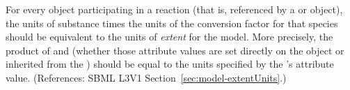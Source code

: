 For every \Species object participating in a reaction (that is, referenced
by a \SpeciesReference or \ModifierSpeciesReference object), the units of
substance times the units of the conversion factor for that species should
be equivalent to the units of \emph{extent} for the model.  More precisely,
the product of  and  (whether
those attribute values are set directly on the \Species object or inherited
from the \Model) should be equal to the units specified by the \Model's
 attribute value.  (References: SBML L3V1
Section~\ref{sec:model-extentUnits}.)

